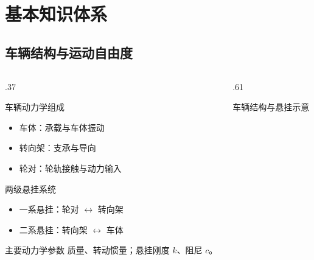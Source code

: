 \documentclass[UTF8,aspectratio=169]{beamer}
\newcommand{\PanelBulletsStart}{%
  \begin{itemize}
  \setlength{\itemsep}{.12cm}
  \setlength{\topsep}{.08cm}
  \setlength{\parskip}{0pt}
}
\newcommand{\PanelBulletsEnd}{\end{itemize}}
\begin{document}
\section{基本知识体系}
\subsection{车辆结构与运动自由度}

\begin{frame}
\vspace*{2.0cm}
\begin{minipage}[t][13.65cm][t]{\linewidth}
\vspace{0pt}
\begin{columns}[T,onlytextwidth]
  \begin{column}{.37\textwidth}
    \begin{minipage}[t][10.65cm][s]{\linewidth}
      \begin{PPTPanel}{车辆动力学组成}
        \PanelBulletsStart
          \item 车体：承载与车体振动
          \item 转向架：支承与导向
          \item 轮对：轮轨接触与动力输入
        \PanelBulletsEnd
      \end{PPTPanel}
      \vfill
      \begin{PPTPanel}{两级悬挂系统}
        \PanelBulletsStart
          \item 一系悬挂：轮对 \(\leftrightarrow\) 转向架
          \item 二系悬挂：转向架 \(\leftrightarrow\) 车体
        \PanelBulletsEnd
      \end{PPTPanel}
      \vfill
      \begin{PPTPanel}{主要动力学参数}
        质量、转动惯量；悬挂刚度 \(k\)、阻尼 \(c\)。
      \end{PPTPanel}
    \end{minipage}
  \end{column}
  \begin{column}{.61\textwidth}
    \begin{PPTPanel}{车辆结构与悬挂示意}
      \centering
\end{PPTPanel}
\end{column}
\end{columns}
\end{minipage}
\end{frame}
\end{document}
